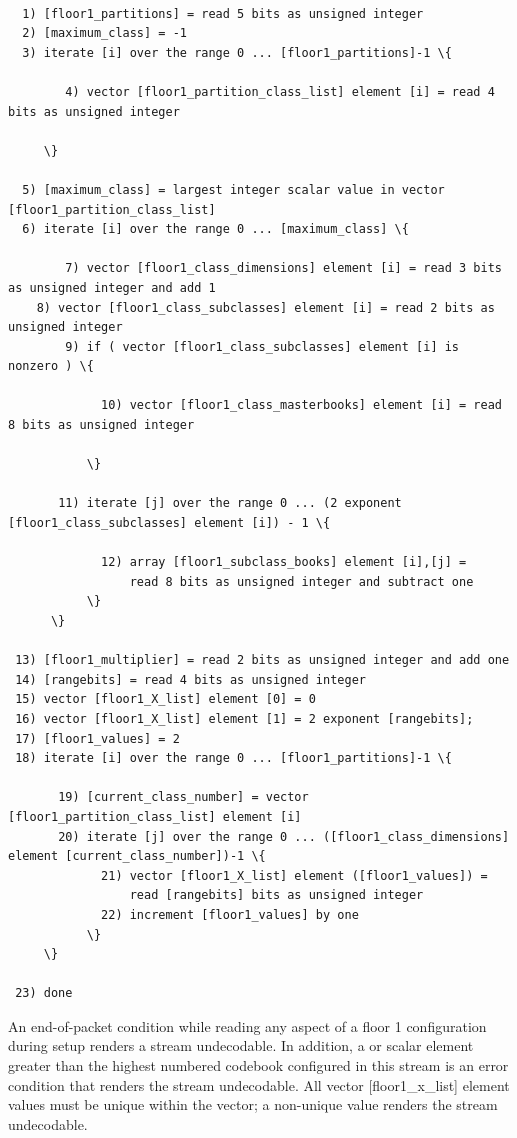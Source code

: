 \begin{Verbatim}[commandchars=\\\{\}]

  1) [floor1_partitions] = read 5 bits as unsigned integer
  2) [maximum_class] = -1
  3) iterate [i] over the range 0 ... [floor1_partitions]-1 \{

        4) vector [floor1_partition_class_list] element [i] = read 4 bits as unsigned integer

     \}

  5) [maximum_class] = largest integer scalar value in vector [floor1_partition_class_list]
  6) iterate [i] over the range 0 ... [maximum_class] \{

        7) vector [floor1_class_dimensions] element [i] = read 3 bits as unsigned integer and add 1
	8) vector [floor1_class_subclasses] element [i] = read 2 bits as unsigned integer
        9) if ( vector [floor1_class_subclasses] element [i] is nonzero ) \{

             10) vector [floor1_class_masterbooks] element [i] = read 8 bits as unsigned integer

           \}

       11) iterate [j] over the range 0 ... (2 exponent [floor1_class_subclasses] element [i]) - 1 \{

             12) array [floor1_subclass_books] element [i],[j] =
                 read 8 bits as unsigned integer and subtract one
           \}
      \}

 13) [floor1_multiplier] = read 2 bits as unsigned integer and add one
 14) [rangebits] = read 4 bits as unsigned integer
 15) vector [floor1_X_list] element [0] = 0
 16) vector [floor1_X_list] element [1] = 2 exponent [rangebits];
 17) [floor1_values] = 2
 18) iterate [i] over the range 0 ... [floor1_partitions]-1 \{

       19) [current_class_number] = vector [floor1_partition_class_list] element [i]
       20) iterate [j] over the range 0 ... ([floor1_class_dimensions] element [current_class_number])-1 \{
             21) vector [floor1_X_list] element ([floor1_values]) =
                 read [rangebits] bits as unsigned integer
             22) increment [floor1_values] by one
           \}
     \}

 23) done
\end{Verbatim}

An end-of-packet condition while reading any aspect of a floor 1
configuration during setup renders a stream undecodable.  In addition,
a  or
 scalar element greater than the
highest numbered codebook configured in this stream is an error
condition that renders the stream undecodable.  All vector
[floor1_x_list] element values must be unique within the vector; a
non-unique value renders the stream undecodable.

